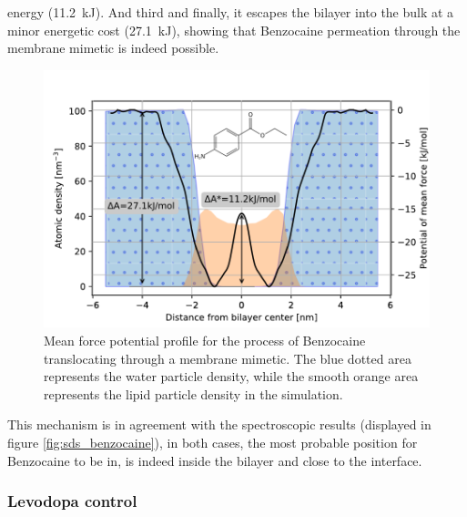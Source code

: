 \documentclass[3p,preprint,review]{elsarticle}
\begin{document}
	energy (\SI{11.2}{\kilo\joule}). And third and finally, it escapes the bilayer
	into the bulk at a minor energetic cost (\SI{27.1}{kJ}), showing that
	Benzocaine
	permeation through the membrane mimetic is indeed possible.\\
	\begin{figure}[htb]
		\centering
		\includegraphics[width=\columnwidth]{benzo_profile_density}
		\caption{Mean force potential profile for the process of Benzocaine
			translocating through a membrane mimetic. The blue dotted area represents
			the water particle density, while the smooth orange area represents the
			lipid particle density in the simulation.}
		\label{fig:benzocaine_profile}
	\end{figure}
	This mechanism is in agreement with the spectroscopic results
	(displayed in figure \ref{fig:sds_benzocaine}), in both cases, the most
	probable
	position for Benzocaine to be in, is indeed inside the bilayer and close to the
	interface.\\
	
	\subsubsection{Levodopa control}
	\label{sec:ldopa}
	
\end{document}
